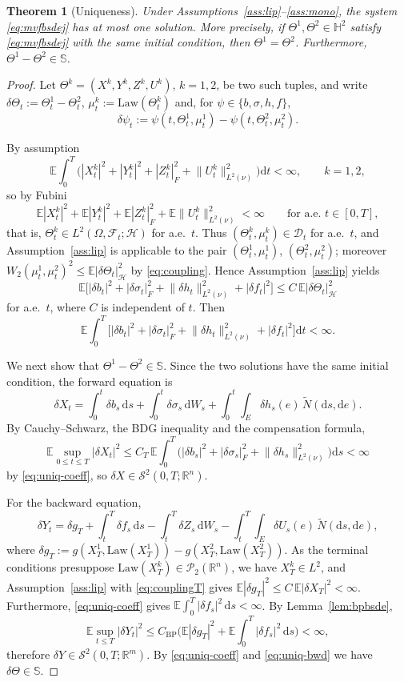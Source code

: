 \documentclass[preprint,12pt]{elsarticle}
\newcommand{\R}{\mathbb{R}}
\newcommand{\E}{\mathbb{E}}
\newcommand{\F}{\mathcal{F}}
\newcommand{\diff}{\mathrm{d}}
\newcommand{\Nt}{\widetilde{N}}
\newcommand{\Lnu}{L^2(\nu)}
\newcommand{\Law}{\mathrm{Law}}
\newcommand{\HH}{\mathbb{S}}
\newcommand{\Ssp}[1]{\mathcal{S}^2(0,T;#1)}
\newcommand{\Hweak}{\mathbb{H}^2}
\newcommand{\Lnorm}[1]{\lVert #1\rVert_{\Lnu}}
\numberwithin{equation}{section}
\theoremstyle{plain}
\newtheorem{theorem}{Theorem}[section]
\theoremstyle{definition}
\theoremstyle{\PaperRemarkStyle}
\begin{document}
\begin{theorem}[Uniqueness]\label{thm:uniq}
Under Assumptions~\ref{ass:lip}--\ref{ass:mono}, the system \eqref{eq:mvfbsdej} has at
most one solution. More precisely, if $\Theta^1,\Theta^2\in\Hweak$ satisfy
\eqref{eq:mvfbsdej} with the same initial condition, then $\Theta^1=\Theta^2$. Furthermore,
$\Theta^1-\Theta^2\in\HH$.
\end{theorem}
\begin{proof}
Let $\Theta^k=(X^k,Y^k,Z^k,U^k)$, $k=1,2$, be two such tuples, and write
$\delta\Theta_t:=\Theta^1_t-\Theta^2_t$, $\mu^k_t:=\Law(\Theta^k_t)$ and, for
$\psi\in\{b,\sigma,h,f\}$,
\[
\delta\psi_t:=\psi(t,\Theta^1_t,\mu^1_t)-\psi(t,\Theta^2_t,\mu^2_t).
\]

By assumption
\[
\E\!\int_0^T\!\big(|X^k_t|^2+|Y^k_t|^2+|Z^k_t|_F^2+\Lnorm{U^k_t}^2\big)\diff t<\infty,
\qquad k=1,2,
\]
so by Fubini
\[
\E|X^k_t|^2+\E|Y^k_t|^2+\E|Z^k_t|_F^2+\E\Lnorm{U^k_t}^2<\infty
\qquad\text{for a.e.\ }t\in[0,T],
\]
that is, $\Theta^k_t\in L^2(\Omega,\F_t;\mathcal H)$ for a.e.\ $t$. Thus
$(\Theta^k_t,\mu^k_t)\in\mathcal D_t$ for a.e.\ $t$, and Assumption~\ref{ass:lip} is
applicable to the pair $(\Theta^1_t,\mu^1_t)$, $(\Theta^2_t,\mu^2_t)$; moreover
$W_2(\mu^1_t,\mu^2_t)^2\le\E|\delta\Theta_t|_{\mathcal H}^2$ by \eqref{eq:coupling}.
Hence Assumption~\ref{ass:lip} yields
\[
\E\big[|\delta b_t|^2+|\delta\sigma_t|_F^2+\Lnorm{\delta h_t}^2+|\delta f_t|^2\big]
\le C\,\E|\delta\Theta_t|_{\mathcal H}^2
\]
for a.e.\ $t$, where $C$ is independent of $t$. Then
\begin{equation}\label{eq:uniq-coeff}
\E\!\int_0^T\!\big[|\delta b_t|^2+|\delta\sigma_t|_F^2+\Lnorm{\delta h_t}^2
+|\delta f_t|^2\big]\diff t<\infty .
\end{equation}

We next show that $\Theta^1-\Theta^2\in\HH$. Since the two solutions have the same
initial condition, the forward equation is
\[
\delta X_t=\int_0^t\delta b_s\,\diff s+\int_0^t\delta\sigma_s\,\diff W_s
+\int_0^t\!\!\int_E\delta h_s(e)\,\Nt(\diff s,\diff e).
\]
By Cauchy--Schwarz, the BDG inequality and the compensation formula,
\[
\E\sup_{0\le t\le T}|\delta X_t|^2
\le C_T\,\E\!\int_0^T\!\big(|\delta b_s|^2+|\delta\sigma_s|_F^2
+\Lnorm{\delta h_s}^2\big)\diff s<\infty
\]
by \eqref{eq:uniq-coeff}, so $\delta X\in\Ssp{\R^n}$.

For the backward equation,
\[
\delta Y_t=\delta g_T+\int_t^T\delta f_s\,\diff s-\int_t^T\delta Z_s\,\diff W_s
-\int_t^T\!\!\int_E\delta U_s(e)\,\Nt(\diff s,\diff e),
\]
where $\delta g_T:=g(X^1_T,\Law(X^1_T))-g(X^2_T,\Law(X^2_T))$. As the terminal
conditions presuppose $\Law(X^k_T)\in\mathcal P_2(\R^n)$, we have $X^k_T\in L^2$, and
Assumption~\ref{ass:lip} with \eqref{eq:couplingT} gives
$\E|\delta g_T|^2\le C\,\E|\delta X_T|^2<\infty$. Furthermore, \eqref{eq:uniq-coeff}
gives $\E\int_0^T|\delta f_s|^2\,\diff s<\infty$. By Lemma~\ref{lem:bpbsde},
\begin{equation}\label{eq:uniq-bwd}
\E\sup_{t\le T}|\delta Y_t|^2
\le C_{\mathrm{BP}}\Big(\E|\delta g_T|^2+\E\!\int_0^T|\delta f_s|^2\,\diff s\Big)
<\infty ,
\end{equation}
therefore $\delta Y\in\Ssp{\R^m}$. By \eqref{eq:uniq-coeff} and \eqref{eq:uniq-bwd} we
have $\delta\Theta\in\HH$.


\end{proof}
\end{document}
